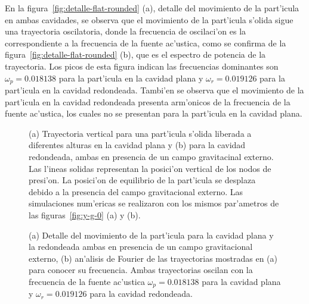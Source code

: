 En la figura~\ref{fig:detalle-flat-rounded} (a), detalle del movimiento de la part'icula en ambas
cavidades, se observa que el movimiento de la part'icula s'olida sigue una trayectoria oscilatoria, donde
la frecuencia  de oscilaci'on es la correspondiente a la frecuencia de la fuente ac'ustica, como se confirma de la 
figura~\ref{fig:detalle-flat-rounded} (b), que es el espectro de potencia de la trayectoria. 
Los picos de esta figura indican las frecuencias dominantes son
$\omega_p=0.018138$ para la part'icula en la cavidad plana y $\omega_r=0.019126$ para la part'icula en la cavidad
redondeada. Tambi'en se observa que el movimiento de la part'icula en la cavidad redondeada presenta arm'onicos
de la frecuencia de la fuente ac'ustica, los cuales no se presentan para la part'icula en la cavidad plana.

\begin{figure}


\vskip 5mm
\caption{\label{fig:path-3} 
(a) Trayectoria vertical para una part'icula s'olida liberada a diferentes
alturas en la cavidad plana y
(b)  para la cavidad redondeada, ambas en presencia de un campo gravitacinal externo.
Las l'ineas solidas representan la posici'on vertical de los nodos de presi'on. La posici'on
de equilibrio de la part'icula se desplaza debido a la presencia del campo gravitacional externo.
Las simulaciones num'ericas se realizaron con los mismos par'ametros 
de las figuras~\ref{fig:y-g-0} (a) y (b).
}
\end{figure}
\begin{figure}


\caption{\label{fig:detalle-flat-rounded-gravity}
(a) Detalle del movimiento de la part'icula para la cavidad
plana y la redondeada ambas en presencia de un campo gravitacional externo, 
(b) an'alisis de Fourier de las trayectorias mostradas en (a) para conocer su frecuencia.
Ambas trayectorias oscilan con la frecuencia de la fuente ac'ustica $\omega_p=0.018138$
para la cavidad plana
y $\omega_r = 0.019126$ para la cavidad redondeada.
}
\end{figure}


